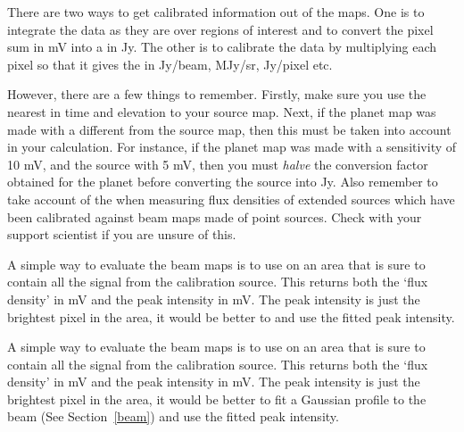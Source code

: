    There are two ways to get calibrated information out of the maps. One
   is to integrate the data as they are over regions of interest and to
   convert the pixel sum in mV into a
   in Jy. The other is to calibrate the data by multiplying each pixel
   so that it gives the
   in Jy/beam, MJy/sr, Jy/pixel etc.

   However, there are a few things to remember. Firstly, make sure you
   use the nearest
   in time and elevation to your source map. Next, if the planet map was
   made with a different
   from the source map, then this must be taken into account in your
   calculation. For instance, if the planet map was made with a
   sensitivity of 10 mV, and the source with 5 mV, then you must
   {\it halve\/} the conversion factor obtained for the planet before
   converting the source into Jy. Also remember to take account of the
   when measuring flux densities of extended
   sources which have been calibrated against beam maps made of point
   sources. Check with your support scientist if you are unsure of this.

\begin{htmlonly}
   A simple way to evaluate the beam maps is to use
{\tt {}}
   on an area that is sure to contain all the signal from the
   calibration source. This returns both the `flux density' in mV and
   the peak intensity in mV. The peak intensity is just the brightest
   pixel in the area, it would be better to
   and use the fitted peak intensity.
\end{htmlonly}
\begin{latexonly}
   A simple way to evaluate the beam maps is to use
{\tt {}}
   on an area that is sure to contain all the signal from the
   calibration source. This returns both the `flux density' in mV and
   the peak intensity in mV. The peak intensity is just the brightest
   pixel in the area, it would be better to
   fit a Gaussian profile to the beam
(See Section~\ref{beam})
   and use the fitted peak intensity.
\end{latexonly}

